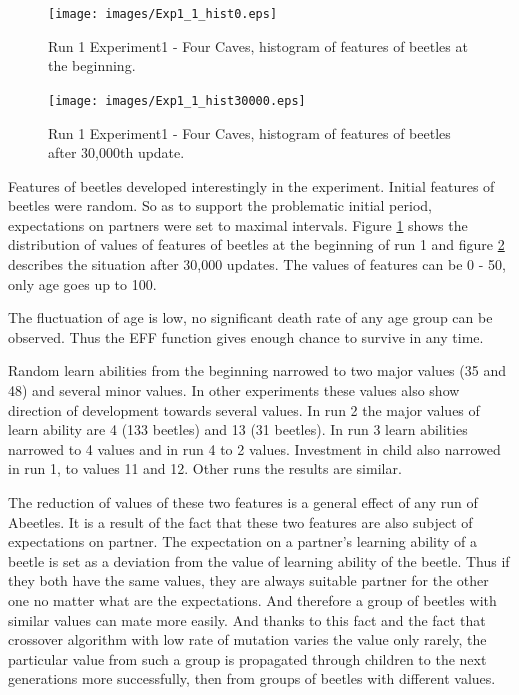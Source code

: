 \documentclass[a4paper,12pt]{report}
\begin{document}
 
\begin{figure}
\begin{center}
  \texttt{[image: images/Exp1\_1\_hist0.eps]}
  \caption{Run 1 Experiment1 - Four Caves, histogram of features of beetles at the beginning.}
  \label{img.four_caves_run1_hist0}
\end{center}
\end{figure}

\begin{figure}
\begin{center}
  \texttt{[image: images/Exp1\_1\_hist30000.eps]}
  \caption{Run 1 Experiment1 - Four Caves, histogram of features of beetles after 30,000th update.}
  \label{img.four_caves_run1_hist30000}
\end{center}
\end{figure}
 
Features of beetles developed interestingly in the experiment. Initial features of beetles were random. So as to support the problematic initial period, expectations on partners were set to maximal intervals. Figure \ref{img.four_caves_run1_hist0} shows the distribution of values of features of beetles at the beginning of run 1 and figure \ref{img.four_caves_run1_hist30000} describes the situation after 30,000 updates. The values of features can be 0 - 50, only age goes up to 100.

The fluctuation of age is low, no significant death rate of any age group can be observed. Thus the EFF function gives enough chance to survive in any time.
 
Random learn abilities from the beginning narrowed to two major values (35 and 48) and several minor values. In other experiments these values also show direction of development towards several values. In run 2 the major values of learn ability are 4 (133 beetles) and 13 (31 beetles). In run 3 learn abilities narrowed to 4 values and in run 4 to 2 values.
Investment in child also narrowed in run 1, to values 11 and 12. Other runs the results are similar.

The reduction of values of these two features is a general effect of any run of Abeetles. It is a result of the fact that these two features are also subject of expectations on partner. The expectation on a partner's learning ability of a beetle is set as a deviation from the value of learning ability of the beetle. Thus if they both have the same values, they are always suitable partner for the other one no matter what are the expectations. And therefore a group of beetles with similar values can mate more easily. And thanks to this fact and the fact that crossover algorithm with low rate of mutation varies the value only rarely, the particular value from such a group is propagated through children to the next generations more successfully, then from groups of beetles with different values.
\end{document}
